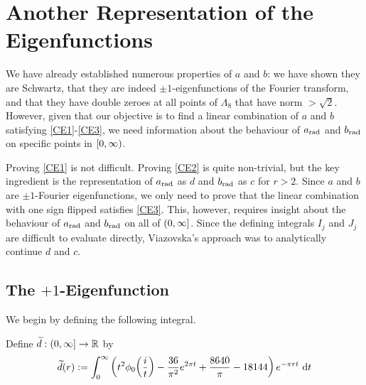 \section{Another Representation of the Eigenfunctions}
\label{Ch4:Sec:Analytic_Cont}

We have already established numerous properties of $a$ and $b$: we have shown they are Schwartz, that they are indeed $\pm1$-eigenfunctions of the Fourier transform, and that they have double zeroes at all points of $\Lambda_8$ that have norm $> \sqrt{2}$. However, given that our objective is to find a linear combination of $a$ and $b$ satisfying \ref{CE1}-\ref{CE3}, we need information about the behaviour of $a_{\operatorname{rad}}$ and $b_{\operatorname{rad}}$ on specific points in $\left[0, \infty\right)$.

Proving \ref{CE1} is not difficult. Proving \ref{CE2} is quite non-trivial, but the key ingredient is the representation of $a_{\operatorname{rad}}$ as $d$ and $b_{\operatorname{rad}}$ as $c$ for $r > 2$. Since $a$ and $b$ are $\pm 1$-Fourier eigenfunctions, we only need to prove that the linear combination with one sign flipped satisfies \ref{CE3}. This, however, requires insight about the behaviour of $a_{\operatorname{rad}}$ and $b_{\operatorname{rad}}$ on all of $\left(0, \infty\right]$. Since the defining integrals $I_j$ and $J_j$ are difficult to evaluate directly, Viazovska's approach was to analytically continue $d$ and $c$.

\subsection{The $+1$-Eigenfunction}

We begin by defining the following integral.

\begin{boxdefinition}
    Define $\widetilde{d} : \left(0, \infty\right] \to \mathbb{R}$ by
    \begin{align*}
        \widetilde{d}(r) := \int_{0}^{\infty} \left( t^2 \phi_0\!\left( \frac{i}{t} \right) - \frac{36}{\pi^2}e^{2\pi t} + \frac{8640}{\pi} - 18144 \right) e^{-\pi r t} \, \operatorname{d}\!{t}
    \end{align*}
\end{boxdefinition}

